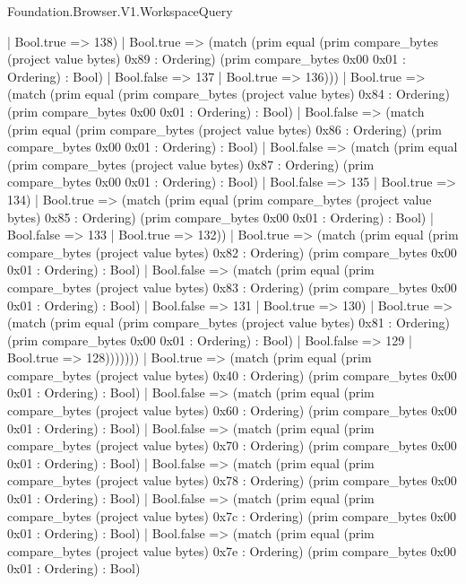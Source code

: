 \begin{lexlean}{Foundation.Browser.V1.WorkspaceQuery}
\begin{semanticmodule}
{                    | Bool.true => 138)
                  | Bool.true => (match (prim equal (prim compare_bytes (project value bytes) 0x89 : Ordering) (prim compare_bytes 0x00 0x01 : Ordering) : Bool)
                    | Bool.false => 137
                    | Bool.true => 136)))
              | Bool.true => (match (prim equal (prim compare_bytes (project value bytes) 0x84 : Ordering) (prim compare_bytes 0x00 0x01 : Ordering) : Bool)
                | Bool.false => (match (prim equal (prim compare_bytes (project value bytes) 0x86 : Ordering) (prim compare_bytes 0x00 0x01 : Ordering) : Bool)
                  | Bool.false => (match (prim equal (prim compare_bytes (project value bytes) 0x87 : Ordering) (prim compare_bytes 0x00 0x01 : Ordering) : Bool)
                    | Bool.false => 135
                    | Bool.true => 134)
                  | Bool.true => (match (prim equal (prim compare_bytes (project value bytes) 0x85 : Ordering) (prim compare_bytes 0x00 0x01 : Ordering) : Bool)
                    | Bool.false => 133
                    | Bool.true => 132))
                | Bool.true => (match (prim equal (prim compare_bytes (project value bytes) 0x82 : Ordering) (prim compare_bytes 0x00 0x01 : Ordering) : Bool)
                  | Bool.false => (match (prim equal (prim compare_bytes (project value bytes) 0x83 : Ordering) (prim compare_bytes 0x00 0x01 : Ordering) : Bool)
                    | Bool.false => 131
                    | Bool.true => 130)
                  | Bool.true => (match (prim equal (prim compare_bytes (project value bytes) 0x81 : Ordering) (prim compare_bytes 0x00 0x01 : Ordering) : Bool)
                    | Bool.false => 129
                    | Bool.true => 128)))))))
      | Bool.true => (match (prim equal (prim compare_bytes (project value bytes) 0x40 : Ordering) (prim compare_bytes 0x00 0x01 : Ordering) : Bool)
        | Bool.false => (match (prim equal (prim compare_bytes (project value bytes) 0x60 : Ordering) (prim compare_bytes 0x00 0x01 : Ordering) : Bool)
          | Bool.false => (match (prim equal (prim compare_bytes (project value bytes) 0x70 : Ordering) (prim compare_bytes 0x00 0x01 : Ordering) : Bool)
            | Bool.false => (match (prim equal (prim compare_bytes (project value bytes) 0x78 : Ordering) (prim compare_bytes 0x00 0x01 : Ordering) : Bool)
              | Bool.false => (match (prim equal (prim compare_bytes (project value bytes) 0x7c : Ordering) (prim compare_bytes 0x00 0x01 : Ordering) : Bool)
                | Bool.false => (match (prim equal (prim compare_bytes (project value bytes) 0x7e : Ordering) (prim compare_bytes 0x00 0x01 : Ordering) : Bool)
}
\end{semanticmodule}
\end{lexlean}
